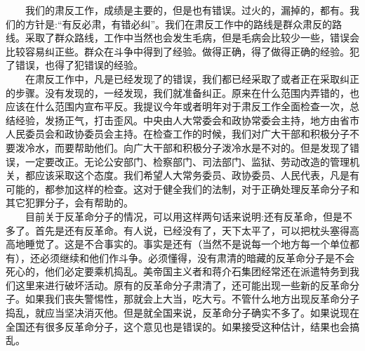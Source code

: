 \documentclass[cn,11pt,chinese]{elegantbook}
\begin{document}
　　我们的肃反工作，成绩是主要的，但是也有错误。过火的，漏掉的，都有。我们的方针是:“有反必肃，有错必纠”。我们在肃反工作中的路线是群众肃反的路线。采取了群众路线，工作中当然也会发生毛病，但是毛病会比较少一些，错误会比较容易纠正些。群众在斗争中得到了经验。做得正确，得了做得正确的经验。犯了错误，也得了犯错误的经验。\\
　　在肃反工作中，凡是已经发现了的错误，我们都已经采取了或者正在采取纠正的步骤。没有发现的，一经发现，我们就准备纠正。原来在什么范围内弄错的，也应该在什么范围内宣布平反。我提议今年或者明年对于肃反工作全面检查一次，总结经验，发扬正气，打击歪风。中央由人大常委会和政协常委会主持，地方由省市人民委员会和政协委员会主持。在检查工作的时候，我们对广大干部和积极分子不要泼冷水，而要帮助他们。向广大干部和积极分子泼冷水是不对的。但是发现了错误，一定要改正。无论公安部门、检察部门、司法部门、监狱、劳动改造的管理机关，都应该采取这个态度。我们希望人大常务委员、政协委员、人民代表，凡是有可能的，都参加这样的检查。这对于健全我们的法制，对于正确处理反革命分子和其它犯罪分子，会有帮助的。\\
　　目前关于反革命分子的情况，可以用这样两句话来说明:还有反革命，但是不多了。首先是还有反革命。有人说，已经没有了，天下太平了，可以把枕头塞得高高地睡觉了。这是不合事实的。事实是还有（当然不是说每一个地方每一个单位都有），还必须继续和他们作斗争。必须懂得，没有肃清的暗藏的反革命分子是不会死心的，他们必定要乘机捣乱。美帝国主义者和蒋介石集团经常还在派遣特务到我们这里来进行破坏活动。原有的反革命分子肃清了，还可能出现一些新的反革命分子。如果我们丧失警惕性，那就会上大当，吃大亏。不管什么地方出现反革命分子捣乱，就应当坚决消灭他。但是就全国来说，反革命分子确实不多了。如果说现在全国还有很多反革命分子，这个意见也是错误的。如果接受这种估计，结果也会搞乱。\\
\end{document}
